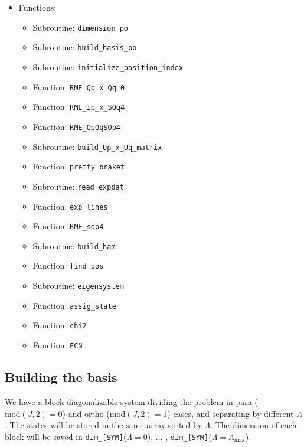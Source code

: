 \documentclass[english,twoside, openright]{report}
\begin{document}
\begin{itemize}
\begin{itemize}
  \end{itemize}
\item Functions:
  \begin{itemize}
  \item Subroutine: \texttt{dimension\_po}
  \item Subroutine: \texttt{build\_basis\_po}
  \item Subroutine: \texttt{initialize\_position\_index}
  \item Function: \texttt{RME\_Qp\_x\_Qq\_0}
  \item Function: \texttt{RME\_Ip\_x\_SOq4}
  \item Function: \texttt{RME\_QpQqSOp4}
  \item Subroutine: \texttt{build\_Up\_x\_Uq\_matrix}
  \item Function: \texttt{pretty\_braket}
  \item Subroutine: \texttt{read\_expdat}
  \item Function: \texttt{exp\_lines}
  \item Function: \texttt{RME\_sop4}
  \item Subroutine: \texttt{build\_ham}
  \item Function: \texttt{find\_pos}
  \item Subroutine: \texttt{eigensystem}
  \item Function: \texttt{assig\_state}
  \item Function: \texttt{chi2}
  \item Function: \texttt{FCN}
  \end{itemize}
\end{itemize}

\subsection{Building the basis}

We have a block-diagonalizable system dividing the problem in para
($\text{mod}(J,2)=0$) and ortho ($\text{mod}(J,2)=1$) cases, and
separating by different $\Lambda$. The states will be stored in the
same array sorted by $\Lambda$. The dimension of each block will be
saved in \texttt{dim\_[SYM]}($\Lambda=0$), ... ,
\texttt{dim\_[SYM]}($\Lambda=\Lambda_{\text{max}}$).
\end{document}
